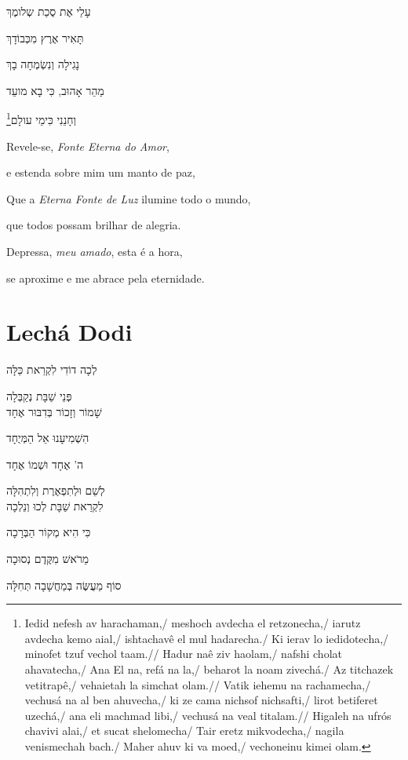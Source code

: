 עָלַי אֶת סֻכַת שְלומֶךְ

תָּאִיר אֶרֶץ מִכְּבוֹדָךְ

נָגִילָה וְנִשְׂמְחָה בָךְ

מַהֵר אָהוּב, כִּי בָא מועֵד

וְחָנֵנִי כִּימֵי עולָם\footnote{
Iedid nefesh av harachaman,/ meshoch avdecha el retzonecha,/ iarutz avdecha kemo aial,/
ishtachavê el mul hadarecha./ Ki ierav lo iedidotecha,/ minofet tzuf vechol taam.//
Hadur naê ziv haolam,/ nafshi cholat ahavatecha,/ Ana El na, refá na la,/ beharot la noam zivechá./ Az titchazek vetitrapê,/ vehaietah la simchat olam.// Vatik iehemu na rachamecha,/
vechusá na al ben ahuvecha,/ ki ze cama nichsof nichsafti,/ lirot betiferet uzechá,/
ana eli machmad libi,/ vechusá na veal titalam.// Higaleh na ufrós chavivi alai,/
et sucat shelomecha/ Tair eretz mikvodecha,/ nagila venismechah bach./ Maher ahuv ki va moed,/
vechoneinu kimei olam.}

\movetooddpage
\raggedright


Revele-se, \emph{Fonte Eterna do Amor},

e estenda sobre mim um manto de paz,

Que a \emph{Eterna Fonte de Luz} ilumine todo o mundo,

que todos possam brilhar de alegria.

Depressa, \emph{meu amado}, esta é a hora,

se aproxime e me abrace pela eternidade.

\movetoevenpage
\raggedleft


\section{Lechá Dodi}

לְכָה דוֹדִי לִקְרַאת כַּלָּה

פְּנֵי שַׁבָּת נְקַבְּלָה\\[10pt]

שָׁמוֹר וְזָכוֹר בְּדִבּוּר אֶחָד

הִשְׁמִיעָנוּ אֵל הַמְּיֻחָד

ה' אֶחָד וּשְׁמוֹ אֶחָד

לְשֵׁם וּלְתִפְאֶרֶת וְלִתְהִלָּה\\[10pt]

לִקְרַאת שַׁבָּת לְכוּ וְנֵלְכָה

כִּי הִיא מְקוֹר הַבְּרָכָה

מֵרֹאשׁ מִקֶּדֶם נְסוּכָה

סוֹף מַעֲשֶּׂה בְּמַחֲשָׁבָה תְּחִלָּה\\[10pt]

